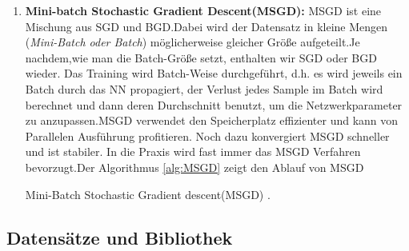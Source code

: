 \documentclass[12pt,a4paper]{scrartcl}
\numberwithin{equation}{section}
\begin{document}
\begin{enumerate}
\begin{algorithm}
		
		\DontPrintSemicolon
		
		\caption{Batch Gradient descent \cite{CNNStory}.}
		\label{alg:BGD}
	\end{algorithm}
\item \textbf{Mini-batch Stochastic Gradient Descent(MSGD): }
MSGD ist eine Mischung aus SGD und BGD.Dabei wird der Datensatz in kleine Mengen (\textit{Mini-Batch oder Batch}) möglicherweise gleicher Größe aufgeteilt.Je nachdem,wie man die Batch-Größe setzt, enthalten wir SGD oder BGD wieder. Das Training wird Batch-Weise durchgeführt, d.h. es wird jeweils ein Batch durch das \ac{NN} propagiert, der Verlust jedes Sample im Batch wird berechnet und dann deren Durchschnitt benutzt, um die Netzwerkparameter zu anzupassen.MSGD verwendet den Speicherplatz effizienter und kann von Parallelen Ausführung profitieren. Noch dazu konvergiert MSGD schneller und ist stabiler. In die Praxis wird fast immer das MSGD Verfahren bevorzugt.Der Algorithmus \ref{alg:MSGD} zeigt den Ablauf von MSGD

\begin{algorithm}
	\DontPrintSemicolon
	
	\caption{Mini-Batch Stochastic Gradient descent(MSGD) \cite{CNNStory}.}
	\label{alg:MSGD}
\end{algorithm}
\end{enumerate}


\subsection{Datensätze und Bibliothek}
\end{document}

